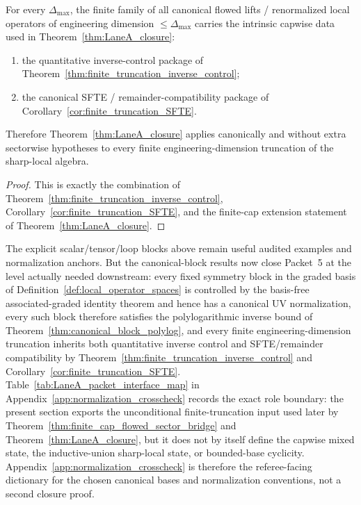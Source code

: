 \begin{corollary}\label{cor:LaneA_all_finite_truncations}
For every $\Delta_{\max}$, the finite family of all canonical flowed lifts / renormalized local operators of engineering dimension $\le \Delta_{\max}$ carries the intrinsic capwise data used in Theorem~\ref{thm:LaneA_closure}:
\begin{enumerate}[label=(\roman*),leftmargin=2.3em]
\item the quantitative inverse-control package of Theorem~\ref{thm:finite_truncation_inverse_control};
\item the canonical SFTE / remainder-compatibility package of Corollary~\ref{cor:finite_truncation_SFTE}.
\end{enumerate}
Therefore Theorem~\ref{thm:LaneA_closure} applies canonically and without extra sectorwise hypotheses to every finite engineering-dimension truncation of the sharp-local algebra.
\end{corollary}

\begin{proof}
This is exactly the combination of Theorem~\ref{thm:finite_truncation_inverse_control}, Corollary~\ref{cor:finite_truncation_SFTE}, and the finite-cap extension statement of Theorem~\ref{thm:LaneA_closure}.
\end{proof}

\begin{remark}
The explicit scalar/tensor/loop blocks above remain useful audited examples and normalization anchors.
But the canonical-block results now close Packet~5 at the level actually needed downstream:
every fixed symmetry block in the graded basis of Definition~\ref{def:local_operator_spaces} is controlled by the basis-free associated-graded identity theorem and hence has a canonical UV normalization,
every such block therefore satisfies the polylogarithmic inverse bound of Theorem~\ref{thm:canonical_block_polylog},
and every finite engineering-dimension truncation inherits both quantitative inverse control and SFTE/remainder compatibility by Theorem~\ref{thm:finite_truncation_inverse_control} and Corollary~\ref{cor:finite_truncation_SFTE}.
Table~\ref{tab:LaneA_packet_interface_map} in Appendix~\ref{app:normalization_crosscheck} records the exact role boundary: the present section exports the unconditional finite-truncation input used later by Theorem~\ref{thm:finite_cap_flowed_sector_bridge} and Theorem~\ref{thm:LaneA_closure}, but it does not by itself define the capwise mixed state, the inductive-union sharp-local state, or bounded-base cyclicity.
Appendix~\ref{app:normalization_crosscheck} is therefore the referee-facing dictionary for the chosen canonical bases and normalization conventions, not a second closure proof.
\end{remark}

